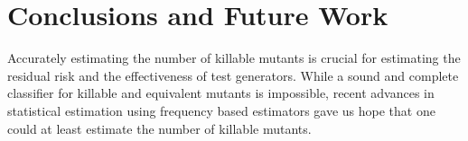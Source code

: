 \documentclass[sigconf,review,anonymous]{acmart}
\begin{document}

\section{Conclusions and Future Work}
Accurately estimating the number of killable mutants is crucial for estimating
the residual risk and the effectiveness of test generators.
While a sound and complete classifier for killable and equivalent mutants is impossible,
recent advances in statistical estimation using frequency %
based estimators gave us hope that one could at least estimate the number of killable mutants.

\end{document}
